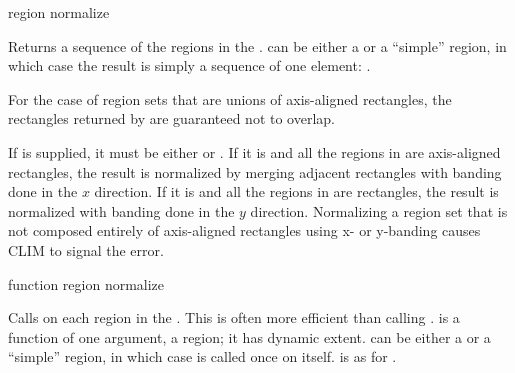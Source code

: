  {region \key normalize}

Returns a sequence of the regions in the  .
 can be either a  or a ``simple'' region, in which
case the result is simply a sequence of one element: .
\ReadOnly

For the case of region sets that are unions of axis-aligned rectangles, the
rectangles returned by  are guaranteed not to overlap.

If  is supplied, it must be either  or
.  If it is  and all the regions in 
are axis-aligned rectangles, the result is normalized by merging adjacent
rectangles with banding done in the $x$ direction.  If it is  and
all the regions in  are rectangles, the result is normalized with
banding done in the $y$ direction.  Normalizing a region set that is not
composed entirely of axis-aligned rectangles using x- or y-banding causes CLIM
to signal the  error.

 {function region \key normalize}

Calls  on each region in the  .  This
is often more efficient than calling .   is
a function of one argument, a region; it has dynamic extent.   can
be either a  or a ``simple'' region, in which case
 is called once on  itself.   is as for
.


